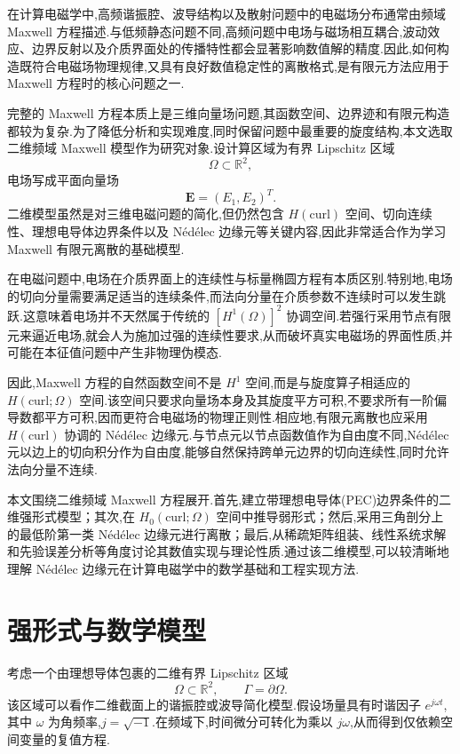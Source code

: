 \documentclass[12pt,hyperref,a4paper,UTF8,twoside]{ctexart}
\newcommand{\E}{\bm{E}}
\newcommand{\R}{\mathbb{R}}
\begin{document}
在计算电磁学中,高频谐振腔、波导结构以及散射问题中的电磁场分布通常由频域 Maxwell 方程描述.与低频静态问题不同,高频问题中电场与磁场相互耦合,波动效应、边界反射以及介质界面处的传播特性都会显著影响数值解的精度.因此,如何构造既符合电磁场物理规律,又具有良好数值稳定性的离散格式,是有限元方法应用于 Maxwell 方程时的核心问题之一.

完整的 Maxwell 方程本质上是三维向量场问题,其函数空间、边界迹和有限元构造都较为复杂.为了降低分析和实现难度,同时保留问题中最重要的旋度结构,本文选取二维频域 Maxwell 模型作为研究对象.设计算区域为有界 Lipschitz 区域
\[
\Omega\subset\R^2,
\]
电场写成平面向量场
\[
\E=(E_1,E_2)^T.
\]
二维模型虽然是对三维电磁问题的简化,但仍然包含 $H(\text{curl})$ 空间、切向连续性、理想电导体边界条件以及 Nédélec 边缘元等关键内容,因此非常适合作为学习 Maxwell 有限元离散的基础模型.

在电磁问题中,电场在介质界面上的连续性与标量椭圆方程有本质区别.特别地,电场的切向分量需要满足适当的连续条件,而法向分量在介质参数不连续时可以发生跳跃.这意味着电场并不天然属于传统的 $[H^1(\Omega)]^2$ 协调空间.若强行采用节点有限元来逼近电场,就会人为施加过强的连续性要求,从而破坏真实电磁场的界面性质,并可能在本征值问题中产生非物理伪模态.

因此,Maxwell 方程的自然函数空间不是 $H^1$ 空间,而是与旋度算子相适应的 $H(\text{curl};\Omega)$ 空间.该空间只要求向量场本身及其旋度平方可积,不要求所有一阶偏导数都平方可积,因而更符合电磁场的物理正则性.相应地,有限元离散也应采用 $H(\text{curl})$ 协调的 Nédélec 边缘元.与节点元以节点函数值作为自由度不同,Nédélec 元以边上的切向积分作为自由度,能够自然保持跨单元边界的切向连续性,同时允许法向分量不连续.

本文围绕二维频域 Maxwell 方程展开.首先,建立带理想电导体(PEC)边界条件的二维强形式模型；其次,在 $H_0(\text{curl};\Omega)$ 空间中推导弱形式；然后,采用三角剖分上的最低阶第一类 Nédélec 边缘元进行离散；最后,从稀疏矩阵组装、线性系统求解和先验误差分析等角度讨论其数值实现与理论性质.通过该二维模型,可以较清晰地理解 Nédélec 边缘元在计算电磁学中的数学基础和工程实现方法.

\section{强形式与数学模型}

考虑一个由理想导体包裹的二维有界 Lipschitz 区域
\[
\Omega\subset\R^2,
\qquad
\Gamma=\partial\Omega.
\]
该区域可以看作二维截面上的谐振腔或波导简化模型.假设场量具有时谐因子 $e^{j\omega t}$,其中 $\omega$ 为角频率,$j=\sqrt{-1}$.在频域下,时间微分可转化为乘以 $j\omega$,从而得到仅依赖空间变量的复值方程.
\end{document}
